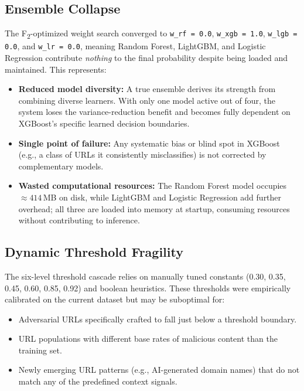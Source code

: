 \documentclass[12pt,a4paper]{article}
\begin{document}
\subsection{Ensemble Collapse}

The F\textsubscript{2}-optimized weight search converged to \texttt{w\_rf = 0.0}, \texttt{w\_xgb = 1.0}, \texttt{w\_lgb = 0.0}, and \texttt{w\_lr = 0.0}, meaning Random Forest, LightGBM, and Logistic Regression contribute \textit{nothing} to the final probability despite being loaded and maintained. This represents:
\begin{itemize}
    \item \textbf{Reduced model diversity:} A true ensemble derives its strength from combining diverse learners. With only one model active out of four, the system loses the variance-reduction benefit and becomes fully dependent on XGBoost's specific learned decision boundaries.
    \item \textbf{Single point of failure:} Any systematic bias or blind spot in XGBoost (e.g., a class of URLs it consistently misclassifies) is not corrected by complementary models.
    \item \textbf{Wasted computational resources:} The Random Forest model occupies $\approx 414$\,MB on disk, while LightGBM and Logistic Regression add further overhead; all three are loaded into memory at startup, consuming resources without contributing to inference.
\end{itemize}

\subsection{Dynamic Threshold Fragility}

The six-level threshold cascade relies on manually tuned constants (0.30, 0.35, 0.45, 0.60, 0.85, 0.92) and boolean heuristics. These thresholds were empirically calibrated on the current dataset but may be suboptimal for:
\begin{itemize}
    \item Adversarial URLs specifically crafted to fall just below a threshold boundary.
    \item URL populations with different base rates of malicious content than the training set.
    \item Newly emerging URL patterns (e.g., AI-generated domain names) that do not match any of the predefined context signals.
\end{itemize}
\end{document}
